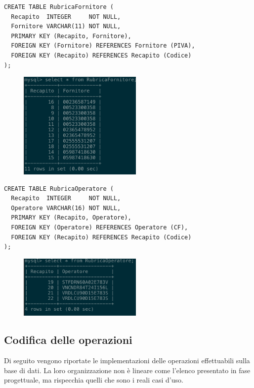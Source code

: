     \begin{lstlisting}
CREATE TABLE RubricaFornitore (
  Recapito  INTEGER     NOT NULL,
  Fornitore VARCHAR(11) NOT NULL,
  PRIMARY KEY (Recapito, Fornitore),
  FOREIGN KEY (Fornitore) REFERENCES Fornitore (PIVA),
  FOREIGN KEY (Recapito) REFERENCES Recapito (Codice)
);
    \end{lstlisting}
    \begin{figure}[H]
      \centering
      \includegraphics[width=6cm]{images/screenshots/schema/rubrica_fornitore.png}
    \end{figure}

    \begin{lstlisting}
CREATE TABLE RubricaOperatore (
  Recapito  INTEGER     NOT NULL,
  Operatore VARCHAR(16) NOT NULL,
  PRIMARY KEY (Recapito, Operatore),
  FOREIGN KEY (Operatore) REFERENCES Operatore (CF),
  FOREIGN KEY (Recapito) REFERENCES Recapito (Codice)
);
    \end{lstlisting}
    \begin{figure}[H]
      \centering
      \includegraphics[width=6cm]{images/screenshots/schema/rubrica_operatore.png}
    \end{figure}

		\pagebreak
	\subsection{Codifica delle operazioni}
		Di seguito vengono riportate le implementazioni delle operazioni effettuabili sulla base di dati. La loro organizzazione non è lineare come l'elenco presentato in fase progettuale, ma rispecchia quelli che sono i reali casi d'uso.


